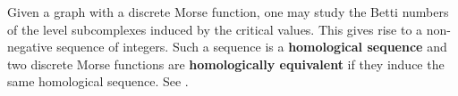 \documentclass{article}
\theoremstyle{definition}
\newtheorem{defn}[thm]  {Definition}
\begin{document}
Given a graph with a discrete Morse function, one may study the Betti numbers of the level subcomplexes induced by the critical values.  This gives rise to a non-negative sequence of integers.  Such a sequence is a \textbf{homological sequence} and two discrete Morse functions are \textbf{homologically equivalent} if they induce the same homological sequence.  See \cite{A-F-F-V-09, A-F-V-11,Ayala10,AGOSR}.


\end{document}
